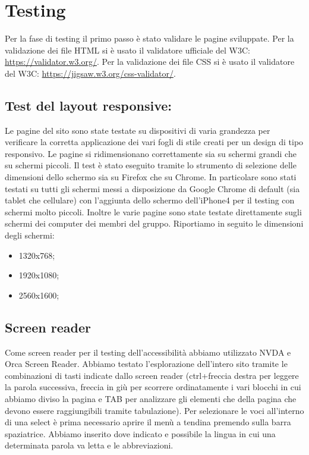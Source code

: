 \newpage
\section{Testing}
Per la fase di testing il primo passo è stato validare le pagine sviluppate.
Per la validazione dei file HTML si è usato il validatore ufficiale del W3C: \url{https://validator.w3.org/}.
Per la validazione dei file CSS si è usato il validatore del W3C: \url{https://jigsaw.w3.org/css-validator/}.

\subsection{Test del layout responsive:} Le pagine del sito sono state testate su dispositivi di varia grandezza per verificare la corretta applicazione dei vari fogli di stile creati per un design di tipo responsivo. Le pagine si ridimensionano correttamente sia su schermi grandi che su schermi piccoli. Il test è stato eseguito tramite lo strumento di selezione delle dimensioni dello schermo sia su Firefox che su Chrome. In particolare sono stati testati su tutti gli schermi messi a disposizione da Google Chrome di default (sia tablet che cellulare) con l'aggiunta dello schermo dell'iPhone4 per il testing con schermi molto piccoli. Inoltre le varie pagine sono state testate direttamente sugli schermi dei computer dei membri del gruppo. Riportiamo in seguito le dimensioni degli schermi:
\begin{itemize}
    \item 1320x768;
    \item 1920x1080;
    \item 2560x1600;
\end{itemize}

\subsection{Screen reader} Come screen reader per il testing dell'accessibilità abbiamo utilizzato NVDA e Orca Screen Reader. Abbiamo testato l'esplorazione dell'intero sito tramite le combinazioni di tasti indicate dallo screen reader (ctrl+freccia destra per leggere la parola successiva, freccia in giù per scorrere ordinatamente i vari blocchi in cui abbiamo diviso la pagina e TAB per analizzare gli elementi che della pagina che devono essere raggiungibili tramite tabulazione). Per selezionare le voci all'interno di una select è prima necessario aprire il menù a tendina premendo sulla barra spaziatrice. Abbiamo inserito dove indicato e possibile la lingua in cui una determinata parola va letta e le abbreviazioni.

